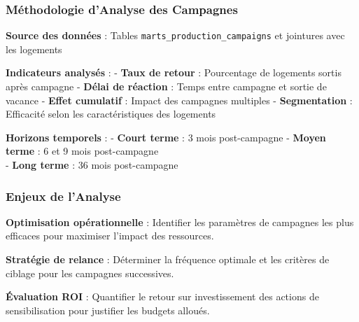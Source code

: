 \documentclass[11pt]{article}
\begin{document}
\subsubsection{Méthodologie d'Analyse des
Campagnes}\label{muxe9thodologie-danalyse-des-campagnes}

\textbf{Source des données} : Tables
\texttt{marts\_production\_campaigns} et jointures avec les logements

\textbf{Indicateurs analysés} : - \textbf{Taux de retour} : Pourcentage
de logements sortis après campagne - \textbf{Délai de réaction} : Temps
entre campagne et sortie de vacance - \textbf{Effet cumulatif} : Impact
des campagnes multiples - \textbf{Segmentation} : Efficacité selon les
caractéristiques des logements

\textbf{Horizons temporels} : - \textbf{Court terme} : 3 mois
post-campagne - \textbf{Moyen terme} : 6 et 9 mois post-campagne\\
- \textbf{Long terme} : 36 mois post-campagne

\subsubsection{Enjeux de l'Analyse}\label{enjeux-de-lanalyse}

\textbf{Optimisation opérationnelle} : Identifier les paramètres de
campagnes les plus efficaces pour maximiser l'impact des ressources.

\textbf{Stratégie de relance} : Déterminer la fréquence optimale et les
critères de ciblage pour les campagnes successives.

\textbf{Évaluation ROI} : Quantifier le retour sur investissement des
actions de sensibilisation pour justifier les budgets alloués.
\end{document}
